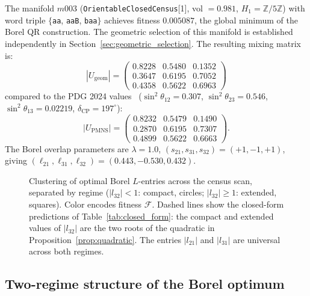 \documentclass[11pt,a4paper]{article}
\newcommand{\Zfive}{\mathbb{Z}/5\mathbb{Z}}
\begin{document}
The manifold $m003$ (\texttt{OrientableClosedCensus}[1],
vol $= 0.981$, $H_1 = \Zfive$) with word triple
$\{$\texttt{aa}, \texttt{aaB}, \texttt{baa}$\}$ achieves fitness $0.005087$,
the global minimum of the Borel QR construction. The geometric selection
of this manifold is established independently in
Section~\ref{sec:geometric_selection}. The resulting mixing matrix is:
\begin{equation}
|U_\mathrm{geom}| = \begin{pmatrix}
  0.8228 & 0.5480 & 0.1352 \\
  0.3647 & 0.6195 & 0.7052 \\
  0.4358 & 0.5622 & 0.6963
\end{pmatrix}
\label{eq:U_pmns_result}
\end{equation}
compared to the PDG 2024 values~\cite{PDG2024} ($\sin^2\theta_{12}=0.307$, $\sin^2\theta_{23}=0.546$, $\sin^2\theta_{13}=0.02219$, $\delta_\mathrm{CP}=197^\circ$):
\begin{equation}
|U_\mathrm{PMNS}| = \begin{pmatrix}
  0.8232 & 0.5479 & 0.1490 \\
  0.2870 & 0.6195 & 0.7307 \\
  0.4899 & 0.5622 & 0.6663
\end{pmatrix}.
\label{eq:U_pmns_pdg}
\end{equation}
The Borel overlap parameters are $\lambda = 1.0$,
$(s_{21}, s_{31}, s_{32}) = (+1, -1, +1)$, giving
$(\ell_{21}, \ell_{31}, \ell_{32}) = (0.443, -0.530, 0.432)$.


\begin{figure}[!t]
\centering
\caption{Clustering of optimal Borel $L$-entries across the census scan,
separated by regime ($|l_{32}| < 1$: compact, circles; $|l_{32}| \geq 1$:
extended, squares). Color encodes fitness $\mathcal{F}$.
Dashed lines show the closed-form predictions of
Table~\ref{tab:closed_form}: the compact and extended values of $|l_{32}|$
are the two roots of the quadratic in Proposition~\ref{prop:quadratic}.
The entries $|l_{21}|$ and $|l_{31}|$ are universal across both regimes.}
\label{fig:clustering}
\end{figure}




\subsection{Two-regime structure of the Borel optimum}
\label{sec:tworegimes}
 
\end{document}
